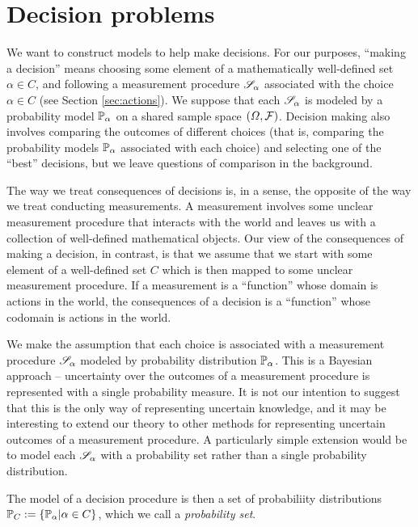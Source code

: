 

\section{Decision problems}\label{sec:dec_probs}

We want to construct models to help make decisions. For our purposes, ``making a decision'' means choosing some element of a mathematically well-defined set $\alpha\in C$, and following a measurement procedure $\mathscr{S}_\alpha$ associated with the choice $\alpha\in C$ (see Section \ref{sec:actions}). We suppose that each $\mathscr{S}_\alpha$ is modeled by a probability model $\mathbb{P}_\alpha$ on a shared sample space $(\Omega,\mathcal{F})$. Decision making also involves comparing the outcomes of different choices (that is, comparing the probability models $\mathbb{P}_\alpha$ associated with each choice) and selecting one of the ``best'' decisions, but we leave questions of comparison in the background.

The way we treat consequences of decisions is, in a sense, the opposite of the way we treat conducting measurements. A measurement involves some unclear measurement procedure that interacts with the world and leaves us with a collection of well-defined mathematical objects. Our view of the consequences of making a decision, in contrast, is that we assume that we start with some element of a well-defined set $C$ which is then mapped to some unclear measurement procedure. If a measurement is a ``function'' whose domain is actions in the world, the consequences of a decision is a ``function'' whose codomain is actions in the world.

We make the assumption that each choice is associated with a measurement procedure $\mathscr{S}_\alpha$ modeled by probability distribution $\mathbb{P}_\alpha$. This is a Bayesian approach -- uncertainty over the outcomes of a measurement procedure is represented with a single probability measure. It is not our intention to suggest that this is the only way of representing uncertain knowledge, and it may be interesting to extend our theory to other methods for representing uncertain outcomes of a measurement procedure. A particularly simple extension would be to model each $\mathscr{S}_\alpha$ with a probability set rather than a single probability distribution. 

The model of a decision procedure is then a set of probabiliity distributions $\mathbb{P}_{C}:=\{\mathbb{P}_\alpha|\alpha\in C\}$, which we call a \emph{probability set}.

